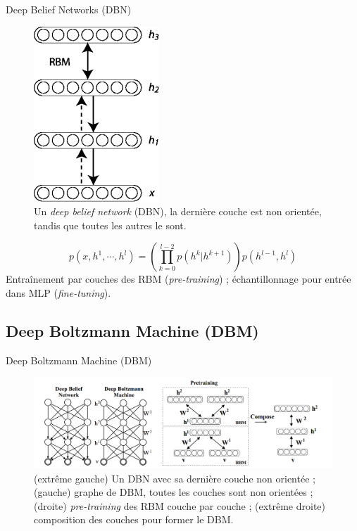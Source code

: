 \begin{frame}{Deep Belief Networks (DBN)}
\begin{figure}[ht!]
\centering
\includegraphics[width = .2\columnwidth]{../fig/DBN3.png}
\caption{Un \emph{deep belief network} (DBN), la dernière couche est non orientée, tandis que toutes les autres le sont.}
\label{fig4}
\end{figure}
\begin{equation}
p(x, h^1, \cdots, h^l) = \left( \prod_{k=0}^{l-2} p(h^k |h^{k+1}) \right) p(h^{l-1}, h^l)
\end{equation}
Entraînement par couches des RBM (\emph{pre-training}) ; échantillonnage pour entrée dans MLP (\emph{fine-tuning}).
\end{frame}




\subsection{Deep Boltzmann Machine (DBM)}

\begin{frame}{Deep Boltzmann Machine (DBM)}
\begin{figure}[ht!]
\centering
\includegraphics[width = \columnwidth]{../fig/dbm.png}
\caption{(extrême gauche) Un DBN avec sa dernière couche non orientée ; (gauche) graphe de DBM, toutes les couches sont non orientées ; (droite) \emph{pre-training} des RBM couche par couche ; (extrême droite) composition des couches pour former le DBM.}
\label{fig5}
\end{figure}


\end{frame}
